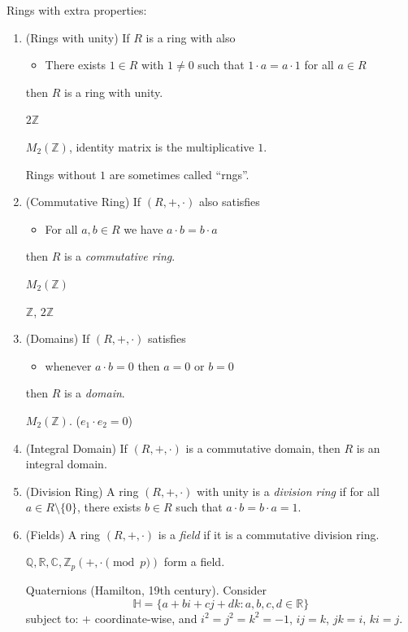 Rings with extra properties:
\begin{enumerate}
	\item (Rings with unity)
		If $R$ is a ring with also
		\begin{itemize}
			\item [M2] There exists $1 \in R$ with $1 \neq 0$ such that $1 \cdot a = a \cdot 1$ for all $a \in R$
		\end{itemize}
		then $R$ is a ring with unity.
	\begin{nonexample}
		$2\mathbb{Z}$
	\end{nonexample}
	\begin{example}
		$M_2(\mathbb{Z})$, identity matrix is the multiplicative $1$.
	\end{example}
	\begin{notation}
		Rings without $1$ are sometimes called ``rngs''.
	\end{notation}
\item (Commutative Ring)
	If $(R, + ,\cdot)$ also satisfies
	\begin{itemize}
		\item [M3] For all $a, b \in R$ we have $a \cdot b = b \cdot a$
	\end{itemize}
	then $R$ is a \textit{commutative ring}.
	\begin{nonexample}
		$M_2(\mathbb{Z})$
	\end{nonexample}
	\begin{example}
		$\mathbb{Z}$, $2\mathbb{Z}$
	\end{example}
\item (Domains)
	If $(R, + , \cdot)$ satisfies
	\begin{itemize}
		\item [M4] whenever $a \cdot b = 0$ then $a=0$ or $b=0$
	\end{itemize}
	then $R$ is a \textit{domain}.
	\begin{nonexample}
		$M_2(\mathbb{Z})$. ($e_1 \cdot e_2 = 0$)
	\end{nonexample}
\item (Integral Domain)
	If $(R, +,  \cdot)$ is a commutative domain, then $R$ is an integral domain.
\item (Division Ring)
	A ring $(R, + , \cdot)$ with unity is a \textit{division ring} if for all $a \in R \setminus \{0\} $, there exists $b \in R$ such that $a \cdot b=  b\cdot a = 1$.
\item (Fields)
	A ring $(R, +, \cdot)$ is a \textit{field} if it is a commutative division ring.
	\begin{example}
		$\mathbb{Q}, \mathbb{R}, \mathbb{C}, \mathbb{Z}_p(+, \cdot \pmod p)$ form a field.
	\end{example}
	\begin{example}
		Quaternions (Hamilton, 19th century). Consider \[
			\mathbb{H} = \{a+bi+cj+dk: a,b,c,d \in \mathbb{R}\} 
		\] 
		subject to: $+$ coordinate-wise, and $i^2 = j^2 = k^2  = -1$, $ij = k$, $jk = i$, $ki = j$.


\end{example}
\end{enumerate}
